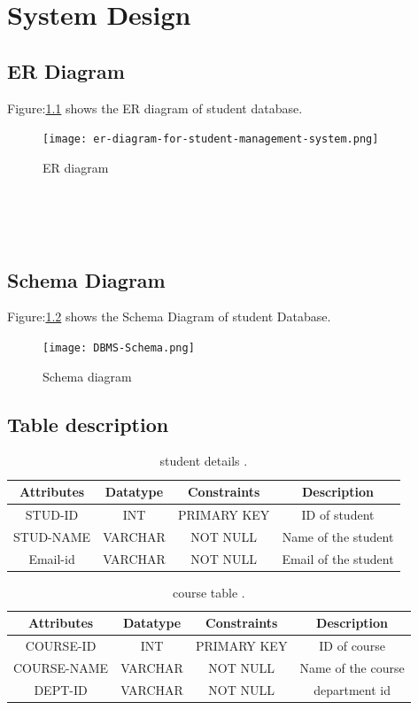 \documentclass[12pt, letter paper]{report}
\begin{document}
\chapter{System Design}
\section{ER Diagram} 
Figure:\ref{fig:er-diagram-for-student-management-system.png} shows the ER diagram of student database.
\begin{figure}[h]
 \centering
 \texttt{[image: er-diagram-for-student-management-system.png]}
 \caption{ER diagram}
 \label{fig:er-diagram-for-student-management-system.png}
\end{figure}
\\
\\
\\
\section{Schema Diagram} 
Figure:\ref{fig:DBMS-Schema.png} shows the Schema Diagram of student Database.
\begin{figure}[h]
 \centering
 \texttt{[image: DBMS-Schema.png]}
 \caption{Schema diagram}
 \label{fig:DBMS-Schema.png}
\end{figure}
\section{Table description} 
\begin{center}
\begin{table}[h!]
\centering
    \begin{tabular}{|c|c|c|c|}
    \hline
      Attributes &Datatype &Constraints&Description  \\
      \hline
      \hline
         STUD-ID&INT&PRIMARY KEY&ID of student  \\
         \hline
         STUD-NAME&VARCHAR&NOT NULL& Name of the student\\ 
         \hline
         Email-id&VARCHAR&NOT NULL& Email of the student\\ 
         \hline
    \end{tabular}
    \caption{student details .}
\label{table:1}
    \end{table}
\end{center}

\begin{center}
\begin{table}[h!]
\centering
    \begin{tabular}{|c|c|c|c|}
    \hline
      Attributes &Datatype &Constraints&Description  \\
      \hline
      \hline
         COURSE-ID&INT&PRIMARY KEY&ID of course  \\
         \hline
         COURSE-NAME&VARCHAR&NOT NULL& Name of the course\\ 
         \hline
         DEPT-ID&VARCHAR&NOT NULL& department id\\ 
         \hline
    \end{tabular}
    \caption{course table .}
\label{table:1}
    \end{table}
\end{center}
\end{document}
